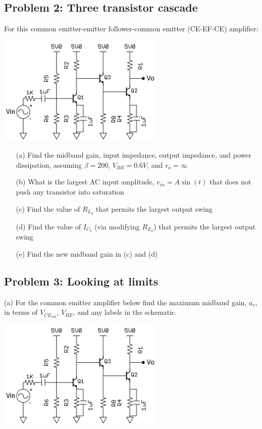 \documentclass[11pt,twoside]{article}
\begin{document}
\subsection*{Problem 2: Three transistor cascade}
	For this common emitter-emitter follower-common emitter (CE-EF-CE) amplifier:
\begin{center}
\includegraphics[width=0.6\textwidth]{ce-ef-ce.png}
\end{center}
\begin{enumerate}
	\item[(a)] Find the midband gain, input impedance, output impedance, and power dissipation, assuming $\beta=200$, $V_{BE}=0.6V$, and $r_o=\infty$
	\item[(b)] What is the largest AC input amplitude, $v_{in}=A\sin(t)$ that does not push any transistor into saturation
	\item[(c)] Find the value of $R_{L_2}$ that permits the largest output swing
	\item[(d)] Find the value of $I_{C_2}$ (via modifying $R_{E_2}$) that permits the largest output swing
	\item[(e)] Find the new midband gain in (c) and (d)
\end{enumerate}

\subsection*{Problem 3: Looking at limits}
	\item[(a)] For the common emitter amplifier below find the maximum midband gain, $a_v$, in terms of $V_{CE_{sat}}$, $V_{BE}$, and any labels in the schematic. 

\begin{center}
\includegraphics[width=0.6\textwidth]{ce-ef-ce.png}
\end{center}
\end{document}
